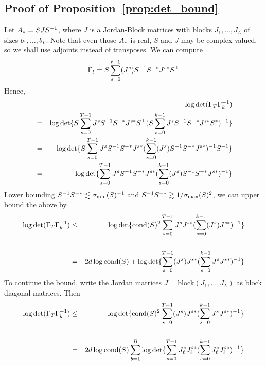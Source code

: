\subsection{Proof of Proposition~\ref{prop:det_bound}}
Let $A_{*} = SJS^{-1}$, where $J$ is a Jordan-Block matrices with blocks $J_1,\dots,J_L$ of sizes $b_1,\dots,b_L$. Note that even those $A_{*}$ is real, $S$ and $J$ may be complex valued, so we shall use adjoints instead of transposes. We can compute 
\begin{eqnarray*}
\Gamma_{t} =  S\sum_{s=0}^{t-1} (J^s)S^{-1}S^{-*}J^{s*}S^{\top}
\end{eqnarray*}
Hence, 
\begin{eqnarray*}
&&\log \det (\Gamma_T \Gamma_k^{-1}) \\
&=&  \log \det \{S\sum_{s=0}^{T-1} J^sS^{-1}S^{-*}J^{s*}S^\top(S\sum_{s=0}^{k-1} J^sS^{-1}S^{-*}J^{s*}S^*)^{-1} \}\\
&=&  \log \det \{S\sum_{s=0}^{T-1} J^sS^{-1}S^{-*}J^{s*}(\sum_{s=0}^{k-1} (J^s)S^{-1}S^{-*}J^{s*})^{-1}S^{-1} \}\\
&=&  \log \det \{\sum_{s=0}^{T-1} J^sS^{-1}S^{-*}J^{s*}(\sum_{s=0}^{k-1} (J^s)S^{-1}S^{-*}J^{s*})^{-1} \}\\
\end{eqnarray*}
Lower bounding $S^{-1}S^{-*} \lesssim \sigma_{\min}(S)^{-1}$ and $S^{-1}S^{-*} \gtrsim 1/\sigma_{\max}(S)^2$, we can upper bound the above by
\begin{eqnarray*}
\log \det (\Gamma_T \Gamma_k^{-1}) &\le& \log \det \{\mathrm{cond}(S)^2\sum_{s=0}^{T-1} J^sJ^{s*}(\sum_{s=0}^{k-1} (J^s)J^{s*})^{-1} \} \\\\
&=&2 d \log \mathrm{cond}(S) + \log \det \{\sum_{s=0}^{T-1} (J^s)J^{s*}(\sum_{s=0}^{k-1} J^sJ^{s*})^{-1} \} \\
\end{eqnarray*}
To continue the bound, write the Jordan matrices $J = \mathrm{block}(J_1,\dots,J_L)$ as block diagonal matrices. Then 
\begin{eqnarray*}
\log \det (\Gamma_T \Gamma_k^{-1}) &\le& \log \det \{\mathrm{cond}(S)^2\sum_{s=0}^{T-1} (J^s)J^{s*}(\sum_{s=0}^{k-1} J^sJ^{s*})^{-1} \} \\\\
&=&2 d \log \mathrm{cond}(S) \sum_{b=1}^B \log \det \{\sum_{s=0}^{T-1} J_{\ell}^sJ_{\ell}^{s*}(\sum_{s=0}^{k-1} J_{\ell}^sJ_{\ell}^{s*})^{-1} \} \\
\end{eqnarray*}
